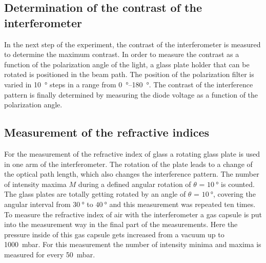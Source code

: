\subsection{Determination of the contrast of the interferometer}

In the next step of the experiment, the contrast of the interferometer is measured to determine the maximum contrast.
In order to measure the contrast as a function of the polarization angle of the light, a glass plate holder that can be rotated is positioned in the beam path.
The position of the polarization filter is varied in \SI{10}{\degree} steps in a range from \SIrange{0}{180}{\degree}. 
The contrast of the interference pattern is finally determined by measuring the diode voltage as a function of the polarization angle.

\subsection{Measurement of the refractive indices}
For the measurement of the refractive index of glass a rotating glass plate is used in one arm of the interferometer. The rotation of the plate leads to a change of the optical path length, which also changes the interference pattern. The number of intensity maxima $M$ during a defined angular rotation of $\theta$ = $\SI{10}{\degree}$ is counted. The glass plates are totally getting rotated by an angle of $\theta$ = $\SI{10}{\degree}$, covering the angular interval from $\SI{30}{\degree}$ to $\SI{40}{\degree}$ and this measurement was repeated ten times. \newline
\noindent
To measure the refractive index of air with the interferometer a gas capsule is put into the measurement way in the final part of the measurements. Here the  pressure inside of this gas capsule gets increased from a vacuum up to \SI{1000}{\milli\bar}. For this measurement the number of intensity minima and maxima is measured for every \SI{50}{\milli\bar}.